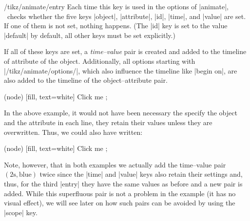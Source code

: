 \begin{key}{/tikz/animate/entry}
    Each time this key is used in the options of |animate|, \tikzname\ checks
    whether the five keys |object|, |attribute|, |id|, |time|, and |value| are
    set. If one of them is not set, nothing happens. (The |id| key is set to
    the value |default| by default, all other keys must be set explicitly.)

    If all of these keys are set, a \emph{time--value} pair is created and
    added to the timeline of attribute of the object. Additionally, all options
    starting with |/tikz/animate/options/|, which also influence the timeline
    like |begin on|, are also added to the timeline of the object--attribute
    pair.
\begin{codeexample}[
    preamble={\usetikzlibrary{animations}},
    animation list={0.5,1,1.5,2},
]
\tikz [animate = {
  object = node, attribute = fill, time = 0s, value = red, entry,
  object = node, attribute = fill, time = 2s, value = blue, entry,
  object = node, attribute = fill, begin on = click, entry}]
  \node (node) [fill, text=white] { Click me };
\end{codeexample}
    In the above example, it would not have been necessary the specify the
    object and the attribute in each line, they retain their values unless they
    are overwritten. Thus, we could also have written:
\begin{codeexample}[
    preamble={\usetikzlibrary{animations}},
    animation list={0.5,1,1.5,2},
]
\tikz [animate = {
  object = node, attribute = fill, time = 0s, value = red, entry,
                                   time = 2s, value = blue, entry,
                                   begin on = click, entry}]
  \node (node) [fill, text=white] { Click me };
\end{codeexample}
    Note, however, that in both examples we actually add the time--value pair
    $(2\mathrm{s}, \mathrm{blue})$ twice since the |time| and |value| keys also
    retain their settings and, thus, for the third |entry| they have the same
    values as before and a new pair is added. While this superfluous pair is
    not a problem in the example (it has no visual effect), we will see later
    on how such pairs can be avoided by using the |scope| key.


\end{key}
